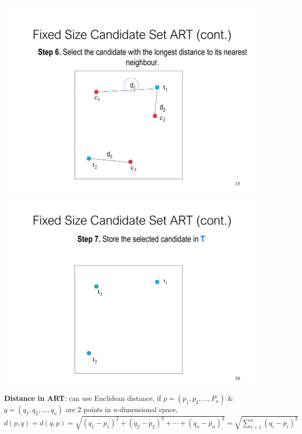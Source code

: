 \documentclass[a4paper]{article}
\begin{document}
\begin{multicols}{3}
        \includegraphics[width=\linewidth]{264.pdf}\\
        \includegraphics[width=\linewidth]{265.pdf}\\
        \textbf{Distance in ART}: can use Euclidean distance, if $p = (p_1, p_2, \ldots, P_n)$ \& $q = (q_1, q_2, \ldots, q_n)$ are 2 points in $n$-dimensional space, $d(p,q) = d(q,p) = \sqrt{{(q_1 - p_1)}^2 + {(q_2 - p_2)}^2 + \cdots + {(q_n-p_n)}^2} = \sqrt{\sum\nolimits_{i=1}^{n}{(q_i-p_i)}^2}$\\

\end{multicols}
\end{document}
